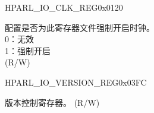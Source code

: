 \begin{register}{H}{PARL\_IO\_CLK\_REG}{0x0120}\label{regdesc:PARLIOCLKREG}
%
%
\regnewline%
\begin{regdesc}\begin{reglist}
\label{fielddesc:PARLIOCLKEN}\item [PARL\_IO\_CLK\_EN] 配置是否为此寄存器文件强制开启时钟。\\
0：无效\\
1：强制开启\\
(R/W)
\end{reglist}\end{regdesc}
\end{register}


\begin{register}{H}{PARL\_IO\_VERSION\_REG}{0x03FC}\label{regdesc:PARLIOVERSIONREG}
%
%
\regnewline%
\begin{regdesc}\begin{reglist}
\label{fielddesc:PARLIODATE}\item [PARL\_IO\_DATE] 版本控制寄存器。 (R/W)
\end{reglist}\end{regdesc}
\end{register}
